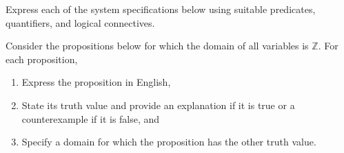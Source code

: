 \documentclass[addpoints]{exam}
\begin{document}
\begin{questions}
\question Express each of the system specifications below using suitable predicates, quantifiers, and logical connectives.

\question
  Consider the propositions below for which the domain of all variables is $\mathbb{Z}$. For each proposition,
  \begin{enumerate}
  \item Express the proposition in English,
  \item State its truth value and provide an explanation if it is true or a counterexample if it is false, and
  \item Specify a domain for which the proposition has the other truth value.
  \end{enumerate}

\end{questions}
\end{document}
